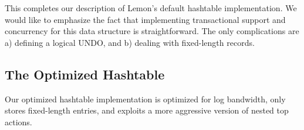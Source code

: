 \documentclass[10pt,letterpaper,twocolumn,english]{article}
\newcommand{\yad}{Lemon\xspace}
\newcommand{\eab}[1]{\textcolor{red}{\bf EAB: #1}}
\begin{document}



This completes our description of \yad's default hashtable
implementation.  We would like to emphasize the fact that implementing
transactional support and concurrency for this data structure is
straightforward.  The only complications are a) defining a logical UNDO, and b) dealing with fixed-length records.




\subsection{The Optimized Hashtable}

Our optimized hashtable implementation is optimized for log bandwidth,
only stores fixed-length entries, and exploits a more aggressive
version of nested top actions.
\end{document}

